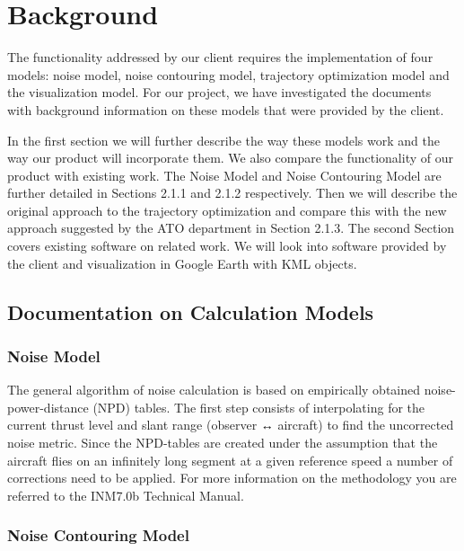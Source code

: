 \section{Background}
 
The functionality addressed by our client requires the implementation of four models: noise model, noise contouring model, trajectory optimization model and the visualization model. For our project, we have investigated the documents with background information on these models that were provided by the client.

In the first section we will further describe the way these models work and the way our product will incorporate them. We also compare the functionality of our product with existing work. The Noise Model and Noise Contouring Model are further detailed in Sections 2.1.1 and 2.1.2 respectively. Then we will describe the original approach to the trajectory optimization and compare this with the new approach suggested by the ATO department in Section 2.1.3. The second Section covers existing software on related work. We will look into software provided by the client and visualization in Google Earth with KML objects.

\subsection{Documentation on Calculation Models}

\subsubsection{Noise Model}

The general algorithm of noise calculation is based on empirically obtained noise-power-distance (NPD) tables. The first step consists of interpolating for the current thrust level and slant range (observer ↔ aircraft) to find the uncorrected noise metric. Since the NPD-tables are created under the assumption that the aircraft flies on an infinitely long segment at a given reference speed a number of corrections need to be applied. For more information on the methodology you are referred to the INM7.0b Technical Manual.

\subsubsection{Noise Contouring Model}


